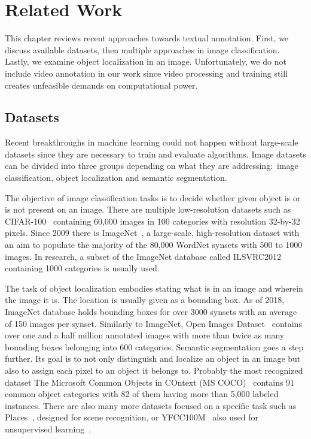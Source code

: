 \chapter{Related Work}\label{chap:related_work}
This chapter reviews recent approaches towards textual annotation. First, we discuss available datasets, then multiple approaches in image classification. Lastly, we examine object localization in an image. Unfortunately, we do not include video annotation in our work since video processing and training still creates unfeasible demands on computational power.

\section{Datasets}
Recent breakthroughs in machine learning could not happen without large-scale datasets since they are necessary to train and evaluate algorithms. Image datasets can be divided into three groups depending on what they are addressing:~image classification, object localization and semantic segmentation.

The objective of image classification tasks is to decide whether given object is or is not present on an image. There are multiple low-resolution datasets such as CIFAR-100~\cite{krizhevsky2009learning} containing 60,000 images in 100 categories with resolution 32-by-32 pixels. Since 2009 there is ImageNet~\cite{ILSVRC15}, a large-scale, high-resolution dataset with an aim to populate the majority of the 80,000 WordNet synsets with 500 to 1000 images. In research, a subset of the ImageNet database called ILSVRC2012 containing 1000 categories is usually used.

The task of object localization embodies stating what is in an image and wherein the image it is. The location is usually given as a bounding box. As of 2018, ImageNet database holds bounding boxes for over 3000 synsets with an average of 150 images per synset. Similarly to ImageNet, Open Images Dataset~\cite{openimages} contains over one and a half million annotated images with more than twice as many bounding boxes belonging into 600 categories. Semantic segmentation goes a step further. Its goal is to not only distinguish and localize an object in an image but also to assign each pixel to an object it belongs to. Probably the most recognized dataset The Microsoft Common Objects in COntext (MS COCO)~\cite{lin2014microsoft} contains 91 common object categories with 82 of them having more than 5,000 labeled instances. There are also many more datasets focused on a specific task such as Places~\cite{zhou2017places}, designed for scene recognition, or YFCC100M~\cite{YFCC100M} also used for unsupervised learning~\cite{amato2017searching}.

